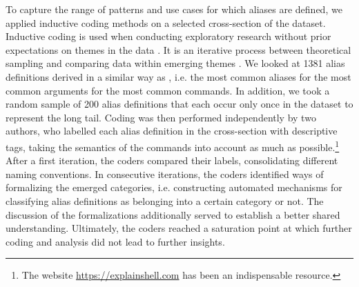 To capture the range of patterns and use cases for which aliases are defined, we applied inductive coding methods on a selected cross-section of the dataset.
Inductive coding is used when conducting exploratory research without prior expectations on themes in the data \cite{thomas:06}.
It is an iterative process between theoretical sampling and comparing data within emerging themes \cite{dey:03}.
We looked at 1381 alias definitions derived in a similar way as , i.e. the most common aliases for the most common arguments for the most common commands.
In addition, we took a random sample of 200 alias definitions that each occur only once in the dataset to represent the long tail.
Coding was then performed independently by two authors, who labelled each alias definition in the cross-section with descriptive tags, taking the semantics of the commands into account as much as possible.\footnote{The website \url{https://explainshell.com} has been an indispensable resource.}
After a first iteration, the coders compared their labels, consolidating different naming conventions.
In consecutive iterations, the coders identified ways of formalizing the emerged categories, i.e. constructing automated mechanisms for classifying alias definitions as belonging into a certain category or not.
The discussion of the formalizations additionally served to establish a better shared understanding.
Ultimately, the coders reached a saturation point at which further coding and analysis did not lead to further insights.


\TODO




%

